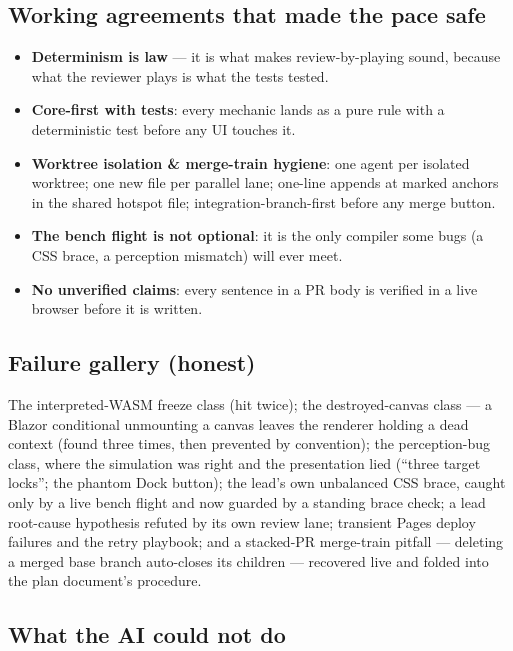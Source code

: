 \documentclass[10pt,twocolumn]{article}
\begin{document}
\subsection{Working agreements that made the pace safe}

\begin{itemize}
  \item \textbf{Determinism is law} --- it is what makes review-by-playing sound, because
        what the reviewer plays is what the tests tested.
  \item \textbf{Core-first with tests}: every mechanic lands as a pure rule with a
        deterministic test before any UI touches it.
  \item \textbf{Worktree isolation \& merge-train hygiene}: one agent per isolated worktree;
        one new file per parallel lane; one-line appends at marked anchors in the shared
        hotspot file; integration-branch-first before any merge button.
  \item \textbf{The bench flight is not optional}: it is the only compiler some bugs (a CSS
        brace, a perception mismatch) will ever meet.
  \item \textbf{No unverified claims}: every sentence in a PR body is verified in a live
        browser before it is written.
\end{itemize}

\subsection{Failure gallery (honest)}

The interpreted-WASM freeze class (hit twice); the destroyed-canvas class --- a Blazor
conditional unmounting a canvas leaves the renderer holding a dead context (found three
times, then prevented by convention); the perception-bug class, where the simulation was
right and the presentation lied (``three target locks''; the phantom Dock button); the
lead's own unbalanced CSS brace, caught only by a live bench flight and now guarded by a
standing brace check; a lead root-cause hypothesis refuted by its own review lane; transient
Pages deploy failures and the retry playbook; and a stacked-PR merge-train pitfall ---
deleting a merged base branch auto-closes its children --- recovered live and folded into
the plan document's procedure.

\subsection{What the AI could not do}
\end{document}
